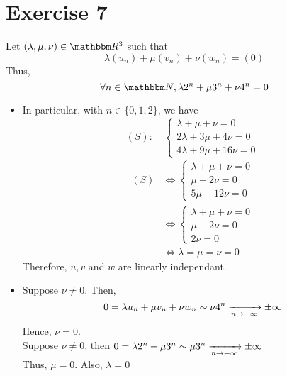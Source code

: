 \part{Exercise 7}
Let $(\lambda, \mu, \nu) \in \R^3$ such that \[
	\lambda (u_n) + \mu (v_n) + \nu (w_n) = (0) 
\] Thus, \[
	\forall n \in \N, \lambda 2^n + \mu 3^n + \nu 4^n = 0
\]
\newcommand{\tsup}[1]{${}^\text{\rm #1}$}

\begin{itemize}
	\item[\sc\underlin{1\tsup{st} method}]
		In particular, with $n \in \{0,1,2\}$, we have \[
			(S): \quad \begin{cases}
				\lambda+\mu+\nu = 0\\
				2 \lambda + 3\mu + 4\nu = 0\\
				4\lambda + 9\mu + 16\nu = 0
			\end{cases}
		\]
		\begin{align*}
			(S) &\iff \begin{cases}
				\lambda + \mu + \nu = 0\\
				\mu + 2\nu = 0\\
				5\mu + 12\nu = 0
			\end{cases}\\
			&\iff \begin{cases}
				\lambda + \mu + \nu = 0\\
				\mu + 2\nu = 0\\
				2\nu =0
			\end{cases}\\
			&\iff \lambda = \mu = \nu = 0
		\end{align*}
		Therefore,  $u, v$ and $w$ are linearly independant.
	\item[\sc\underlin{2\tsup{nd} method}]
		Suppose $\nu \neq 0$. Then, \[
			0 = \lambda u_n + \mu v_n + \nu w_n \sim \nu 4^n \xrightarrow[n\to +\infty]{} \pm \infty
		\] Hence, $\nu = 0$.\\
		Suppose $\nu \neq 0$, then $0 = \lambda 2^n + \mu 3^n \sim \mu 3^n \xrightarrow[n\to +\infty]{} \pm\infty$\\
		Thus, $\mu = 0$. Also,  $\lambda = 0$
\end{itemize}
